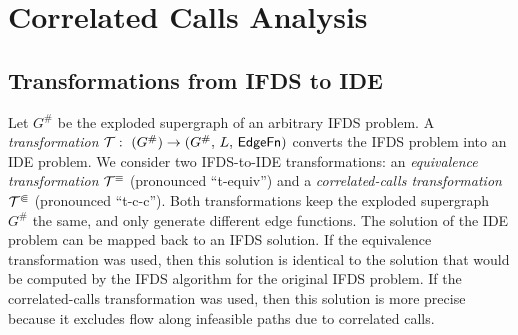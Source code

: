 \section{Correlated Calls Analysis}\label{sec:cca}


\subsection{Transformations from IFDS to IDE}\label{seq:transIfdsIde}


Let $G^\#$ be the exploded supergraph of an arbitrary IFDS problem. A \emph{transformation}
$\mathcal T:\ (G^\#)\to (G^\#,\,L,\,\edgefn)$
converts the IFDS problem into an IDE problem.
We consider two IFDS-to-IDE transformations: an \textit{equivalence transformation} $\mathcal T^\equiv$ (pronounced ``t-equiv'') and
a \textit{correlated-calls transformation} $\mathcal T^\Subset$ (pronounced ``t-c-c'').
Both transformations keep the exploded supergraph $G^\#$ the same, and only generate different edge functions.
The solution of the IDE problem
can be mapped back to an IFDS solution.
If the equivalence transformation was used, then this solution is identical to the
solution that would be computed by the IFDS algorithm for the original IFDS problem.
If the correlated-calls transformation was used, then this solution is more precise
because it excludes flow along infeasible paths due to correlated calls.

